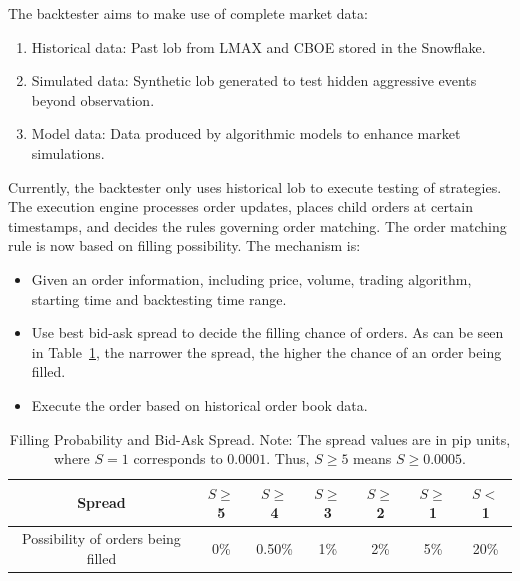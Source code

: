 The backtester aims to make use of complete market data:
\begin{enumerate}
    \item Historical data: Past \gls{lob} from LMAX and CBOE stored in the Snowflake.
    \item Simulated data: Synthetic \gls{lob} generated to test hidden aggressive events beyond observation.
    \item Model data: Data produced by algorithmic models to enhance market simulations.
\end{enumerate}
Currently, the backtester only uses historical \gls{lob} to execute testing of strategies. The execution engine processes order updates, places child orders at certain timestamps, and decides the rules governing order matching. The order matching rule is now based on filling possibility. The mechanism is:
\begin{itemize}
    \item Given an order information, including price, volume, trading algorithm, starting time and backtesting time range.
    \item Use best bid-ask spread to decide the filling chance of orders. As can be seen in Table~\ref{tab:filling_spread}, the narrower the spread, the higher the chance of an order being filled.
    \item Execute the order based on historical order book data.
\end{itemize} 
    \begin{table}[h]
        \centering
        \begin{tabular}{c|c|c|c|c|c|c}
            \hline
            Spread & $S \geq$ 5 & $S \geq$ 4 & $S \geq$ 3 & $S \geq$ 2 & $S \geq$ 1 & $S <$ 1 \\
            \hline
            Possibility of orders being filled & 0\% & 0.50\% & 1\% & 2\% & 5\% & 20\% \\
            \hline
        \end{tabular}
        \caption{Filling Probability and Bid-Ask Spread. Note: The spread values are in pip units, where $S=1$ corresponds to $0.0001$. Thus, $S \geq 5$ means $S \geq 0.0005$.}
        \label{tab:filling_spread}
    \end{table}



